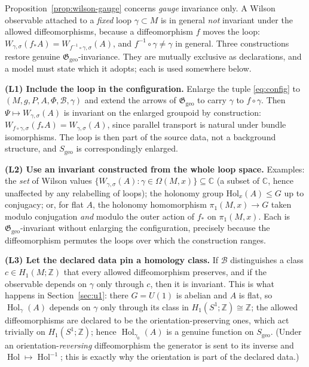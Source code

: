 \documentclass[11pt,a4paper]{article}
\theoremstyle{plain}
\theoremstyle{definition}
\theoremstyle{remark}
\newcommand{\Int}{\mathbb{Z}}
\newcommand{\Cx}{\mathbb{C}}
\newcommand{\Ggeo}{\mathfrak{G}_{\mathrm{geo}}}
\newcommand{\Sgeo}{S_{\mathrm{geo}}}
\newcommand{\Hol}{\operatorname{Hol}}
\begin{document}
Proposition~\ref{prop:wilson-gauge} concerns \emph{gauge} invariance only. A Wilson observable
attached to a \emph{fixed} loop $\gamma\subset M$ is in general \emph{not} invariant under the
allowed diffeomorphisms, because a diffeomorphism $f$ moves the loop:
$W_{\gamma,\sigma}(f_*A)=W_{f^{-1}\circ\gamma,\sigma}(A)$, and $f^{-1}\circ\gamma\neq\gamma$ in
general. Three constructions restore genuine $\Ggeo$-invariance. They are mutually exclusive as
declarations, and a model must state which it adopts; each is used somewhere below.

\medskip
\noindent\textbf{(L1) Include the loop in the configuration.}
Enlarge the tuple \eqref{eq:config} to $(M,g,P,A,\Phi,\mathcal{B},\gamma)$ and extend the arrows
of $\Ggeo$ to carry $\gamma$ to $f\circ\gamma$. Then
$\Psi\mapsto W_{\gamma,\sigma}(A)$ is invariant on the enlarged groupoid by construction:
$W_{f\circ\gamma,\sigma}(f_*A)=W_{\gamma,\sigma}(A)$, since parallel transport is natural under
bundle isomorphisms. The loop is then part of the source data, not a background structure, and
$\Sgeo$ is correspondingly enlarged.

\medskip
\noindent\textbf{(L2) Use an invariant constructed from the whole loop space.}
Examples: the \emph{set} of Wilson values $\{W_{\gamma,\sigma}(A):\gamma\in\Omega(M,x)\}\subseteq\Cx$
(a subset of $\Cx$, hence unaffected by any relabelling of loops); the holonomy group
$\mathrm{Hol}_x(A)\le G$ up to conjugacy; or, for flat $A$, the holonomy homomorphism
$\pi_1(M,x)\to G$ taken modulo conjugation \emph{and} modulo the outer action of $f_*$ on
$\pi_1(M,x)$. Each is $\Ggeo$-invariant without enlarging the configuration, precisely because the
diffeomorphism permutes the loops over which the construction ranges.

\medskip
\noindent\textbf{(L3) Let the declared data pin a homology class.}
If $\mathcal{B}$ distinguishes a class $c\in H_1(M;\Int)$ that every allowed diffeomorphism
preserves, and if the observable depends on $\gamma$ only through $c$, then it is invariant. This
is what happens in Section~\ref{sec:u1}: there $G=U(1)$ is abelian and $A$ is flat, so
$\Hol_\gamma(A)$ depends on $\gamma$ only through its class in $H_1(S^1;\Int)\cong\Int$; the
allowed diffeomorphisms are declared to be the orientation-preserving ones, which act trivially on
$H_1(S^1;\Int)$; hence $\Hol_{\gamma_0}(A)$ is a genuine function on $\Sgeo$. (Under an
orientation-\emph{reversing} diffeomorphism the generator is sent to its inverse and
$\Hol\mapsto\Hol^{-1}$; this is exactly why the orientation is part of the declared data.)
\end{document}
